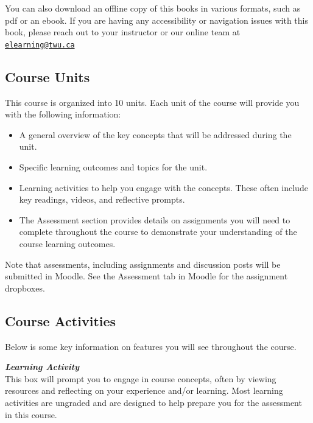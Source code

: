 \documentclass[
]{book}
\providecommand{\tightlist}{%
  \setlength{\itemsep}{0pt}\setlength{\parskip}{0pt}}
\begin{document}
You can also download an offline copy of this books in various formats, such as pdf or an ebook. If you are having any accessibility or navigation issues with this book, please reach out to your instructor or our online team at \href{mailto:elearning@twu.ca}{\nolinkurl{elearning@twu.ca}}

\hypertarget{course-units}{%
\subsection*{Course Units}\label{course-units}}

This course is organized into 10 units. Each unit of the course will provide you with the following information:

\begin{itemize}
\tightlist
\item
  A general overview of the key concepts that will be addressed during the unit.\\
\item
  Specific learning outcomes and topics for the unit.\\
\item
  Learning activities to help you engage with the concepts. These often include key readings, videos, and reflective prompts.\\
\item
  The Assessment section provides details on assignments you will need to complete throughout the course to demonstrate your understanding of the course learning outcomes.
\end{itemize}

\begin{caution}
Note that assessments, including assignments and discussion posts will
be submitted in Moodle. See the Assessment tab in Moodle for the
assignment dropboxes.
\end{caution}

\hypertarget{course-activities}{%
\subsection*{Course Activities}\label{course-activities}}

Below is some key information on features you will see throughout the course.~

\begin{reflect}
\textbf{\emph{Learning Activity}}\\
This box will prompt you to engage in course concepts, often by viewing
resources and reflecting on your experience and/or learning. Most
learning activities are ungraded and are designed to help prepare you
for the assessment in this course.
\end{reflect}
\end{document}
